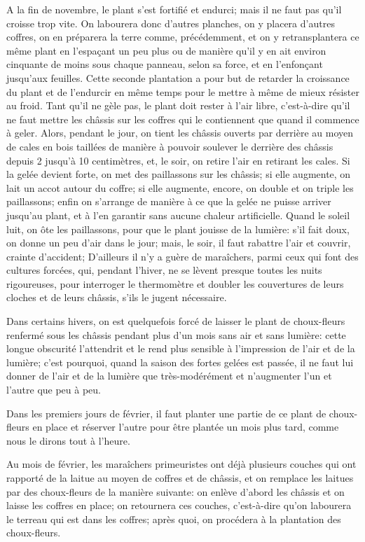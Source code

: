 \documentclass[10pt,a4paper]{book}
\begin{document}
A la fin de novembre, le plant s'est fortifié et endurci; mais il ne faut pas qu'il croisse trop vite. On labourera donc d'autres planches, on y placera d'autres coffres, on en préparera la terre comme, précédemment, et on y retransplantera ce même plant en l'espaçant un peu plus ou de manière qu'il y en ait environ cinquante de moins sous chaque panneau, selon sa force, et en l'enfonçant jusqu'aux feuilles. Cette seconde plantation a pour but de retarder la croissance du plant et de l'endurcir en même temps pour le mettre à même de mieux résister au froid. Tant qu'il ne gèle pas, le plant doit rester à l'air libre, c'est-à-dire qu'il ne faut mettre les châssis sur les coffres qui le contiennent que quand il commence à geler. Alors, pendant le jour, on tient les châssis ouverts par derrière au moyen de cales en bois taillées de manière à pouvoir soulever le derrière des châssis depuis 2 jusqu'à 10 centimètres, et, le soir, on retire l'air en retirant les cales. Si la gelée devient forte, on met des paillassons sur les châssis; si elle augmente, on lait un accot autour du coffre; si elle augmente, encore, on double et on triple les paillassons; enfin on s'arrange de manière à ce que la gelée ne puisse arriver jusqu'au plant, et à l'en garantir sans aucune chaleur artificielle. Quand le soleil luit, on ôte les paillassons, pour que le plant jouisse de la lumière: s'il fait doux, on donne un peu d'air dans le jour; mais, le soir, il faut rabattre l'air et couvrir, crainte d'accident; D'ailleurs il n'y a guère de maraîchers, parmi ceux qui font des cultures forcées, qui, pendant l'hiver, ne se lèvent presque toutes les nuits rigoureuses, pour interroger le thermomètre et doubler les couvertures de leurs cloches et de leurs châssis, s'ils le jugent nécessaire.

Dans certains hivers, on est quelquefois forcé de laisser le plant de choux-fleurs renfermé sous les châssis pendant plus d'un mois sans air et sans lumière: cette longue obscurité l'attendrit et le rend plus sensible à l'impression de l'air et de la lumière; c'est pourquoi, quand la saison des fortes gelées est passée, il ne faut lui donner de l'air et de la lumière que très-modérément et n'augmenter l'un et l'autre que peu à peu.

Dans les premiers jours de février, il faut planter une partie de ce plant de choux-fleurs en place et réserver l'autre pour être plantée un mois plus tard, comme nous le dirons tout à l'heure.

Au mois de février, les maraîchers primeuristes ont déjà plusieurs couches qui ont rapporté de la laitue au moyen de coffres et de châssis, et on remplace les laitues par des choux-fleurs de la manière suivante: on enlève d'abord les châssis et on laisse les coffres en place; on retournera ces couches, c'est-à-dire qu'on labourera le terreau qui est dans les coffres; après quoi, on procédera à la plantation des choux-fleurs.
\end{document}
